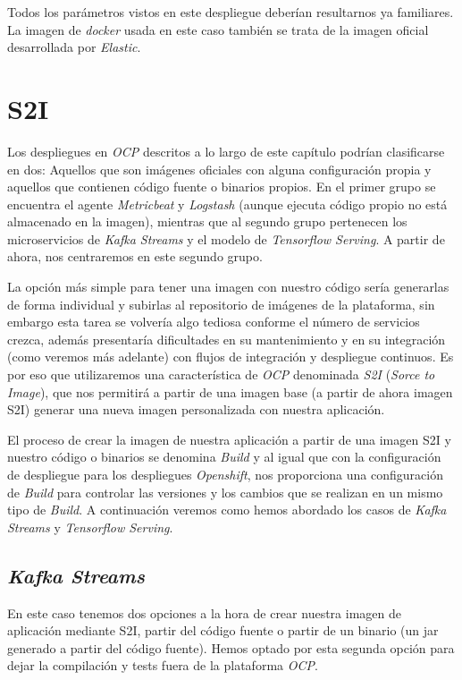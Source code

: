 Todos los parámetros vistos en este despliegue deberían resultarnos ya familiares. La imagen de \textit{docker} usada en este caso también se trata de la imagen oficial desarrollada por \textit{Elastic}.


\section{S2I}
\label{section:cont:s2i}
Los despliegues en \textit{OCP} descritos a lo largo de este capítulo podrían clasificarse en dos: Aquellos que son imágenes oficiales con alguna configuración propia y aquellos que contienen código fuente o binarios propios. En el primer grupo se encuentra el agente \textit{Metricbeat} y \textit{Logstash} (aunque ejecuta código propio no está almacenado en la imagen), mientras que al segundo grupo pertenecen los microservicios de \textit{Kafka Streams} y el modelo de \textit{Tensorflow Serving}. A partir de ahora, nos centraremos en este segundo grupo.

La opción más simple para tener una imagen con nuestro código sería generarlas de forma individual y subirlas al repositorio de imágenes de la plataforma, sin embargo esta tarea se volvería algo tediosa conforme el número de servicios crezca, además presentaría dificultades en su mantenimiento y en su integración (como veremos más adelante) con flujos de integración y despliegue continuos. Es por eso que utilizaremos una característica de \textit{OCP} denominada \textit{S2I} (\textit{Sorce to Image}), que nos permitirá a partir de una imagen base (a partir de ahora imagen S2I) generar una nueva imagen personalizada con nuestra aplicación. 

El proceso de crear la imagen de nuestra aplicación a partir de una imagen S2I y nuestro código o binarios se denomina \textit{Build} y al igual que con la configuración de despliegue para los despliegues \textit{Openshift}, nos proporciona una configuración de \textit{Build} para controlar las versiones y los cambios que se realizan en un mismo tipo de \textit{Build}. A continuación veremos como hemos abordado los casos de \textit{Kafka Streams} y \textit{Tensorflow Serving}.


\subsection{\textit{Kafka Streams}}

En este caso tenemos dos opciones a la hora de crear nuestra imagen de aplicación mediante S2I, partir del código fuente o partir de un binario (un jar generado a partir del código fuente). Hemos optado por esta segunda opción para dejar la compilación y tests fuera de la plataforma \textit{OCP}. 

